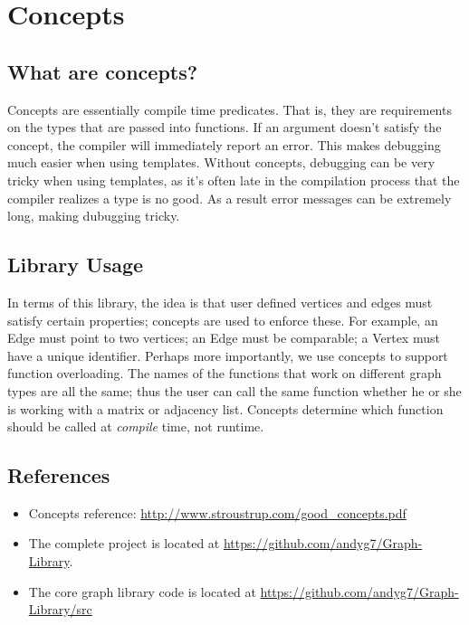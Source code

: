 \documentclass{article}
\begin{document}
\section{Concepts}
\subsection{What are concepts?}
Concepts are essentially compile time predicates. That is, they are requirements on the types that are passed into functions. If an argument doesn't satisfy the concept, the compiler will immediately report an error. This makes debugging much easier when using templates. Without concepts, debugging can be very tricky when using templates, as it's often late in the compilation process that the compiler realizes a type is no good. As a result error messages can be extremely long, making dubugging tricky. 
\subsection{Library Usage}
In terms of this library, the idea is that user defined vertices and edges must satisfy certain properties; concepts are used to enforce these. For example, an Edge must point to two vertices; an Edge must be comparable; a Vertex must have a unique identifier. Perhaps more importantly, we use concepts to support function overloading. The names of the functions that work on different graph types are all the same; thus the user can call the same function whether he or she is working with a matrix or adjacency list. Concepts determine which function should be called at \emph{compile} time, not runtime. 

\subsection{References}
\begin{itemize}
\item Concepts reference: \url{http://www.stroustrup.com/good_concepts.pdf}
\item The complete project is located at \url{https://github.com/andyg7/Graph-Library}.
\item The core graph library code is located at \url{https://github.com/andyg7/Graph-Library/src}
\end{itemize}
\end{document}
